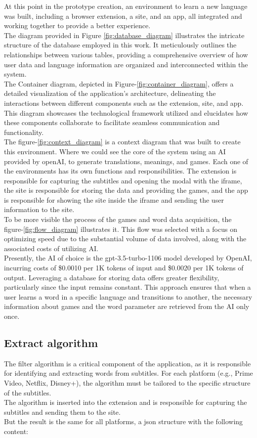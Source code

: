 \documentclass[12pt]{article}
\begin{document}
At this point in the prototype creation, an environment to learn a new language was built, including a browser extension, a site, and an app, all integrated and working together to provide a better experience. \\
The diagram provided in Figure \ref{fig:database_diagram} illustrates the intricate structure of the database employed in this work. It meticulously outlines the relationships between various tables, providing a comprehensive overview of how user data and language information are organized and interconnected within the system. \\
The Container diagram, depicted in Figure-\ref{fig:container_diagram}, offers a detailed visualization of the application's architecture, delineating the interactions between different components such as the extension, site, and app. This diagram showcases the technological framework utilized and elucidates how these components collaborate to facilitate seamless communication and functionality. \\
The figure-\ref{fig:context_diagram} is a context diagram that was built to create this environment. Where we could see the core of the system using an AI provided by openAI, to generate translations, meanings, and games. Each one of the environments has its own functions and responsibilities. The extension is responsible for capturing the subtitles and opening the modal with the iframe, the site is responsible for storing the data and providing the games, and the app is responsible for showing the site inside the iframe and sending the user information to the site. \\
To be more visible the process of the games and word data acquisition, the figure-\ref{fig:flow_diagram} illustrates it. This flow was selected with a focus on optimizing speed due to the substantial volume of data involved, along with the associated costs of utilizing AI. \\
Presently, the AI of choice is the gpt-3.5-turbo-1106 model developed by OpenAI, incurring costs of \$0.0010 per 1K tokens of input and \$0.0020 per 1K tokens of output. Leveraging a database for storing data offers greater flexibility, particularly since the input remains constant. This approach ensures that when a user learns a word in a specific language and transitions to another, the necessary information about games and the word parameter are retrieved from the AI only once. 
\newpage
\subsection{Extract algorithm}
The filter algorithm is a critical component of the application, as it is responsible for identifying and extracting words from subtitles. For each platform (e.g., Prime Video, Netflix, Disney+), the algorithm must be tailored to the specific structure of the subtitles. \\
The algorithm is inserted into the extension and is responsible for capturing the subtitles and sending them to the site. \\
But the result is the same for all platforms, a json structure with the following content:
\end{document}
